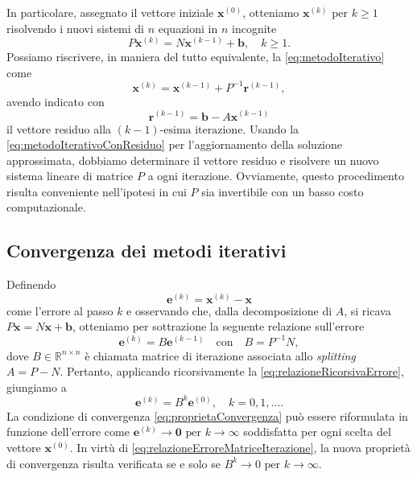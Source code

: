 In particolare, assegnato il vettore iniziale $\mathbf{x}^{(0)}$, otteniamo $\mathbf{x}^{(k)}$ per $k\ge1$ risolvendo i nuovi sistemi di $n$ equazioni in $n$
incognite
\begin{equation}
    \label{eq:metodoIterativo}
    P\mathbf{x}^{(k)}=N\mathbf{x}^{(k-1)} + \mathbf{b},\quad k\ge1.
\end{equation}
Possiamo riscrivere, in maniera del tutto equivalente, la \eqref{eq:metodoIterativo} come
\begin{equation}
    \label{eq:metodoIterativoConResiduo}
    \mathbf{x}^{(k)}=\mathbf{x}^{(k-1)} + P^{-1}\mathbf{r}^{(k-1)},
\end{equation}
avendo indicato con
\[
    \mathbf{r}^{(k-1)}=\mathbf{b}-A\mathbf{x}^{(k-1)}
\]
il vettore residuo alla $(k-1)\text{-esima iterazione}$.\newline
Usando la \eqref{eq:metodoIterativoConResiduo} per l'aggiornamento della soluzione approssimata, dobbiamo determinare il vettore residuo e risolvere un nuovo sistema lineare di
matrice $P$ a ogni iterazione. Ovviamente, questo procedimento risulta conveniente nell'ipotesi in cui $P$ sia invertibile con un basso costo computazionale.
\subsection{Convergenza dei metodi iterativi}
Definendo
\begin{equation}
    \label{eq:errorePassoK}
    \mathbf{e}^{(k)} = \mathbf{x}^{(k)}-\mathbf{x}
\end{equation}
come l'errore al passo $k$ e osservando che, dalla decomposizione di $A$, si ricava $P\mathbf{x}= N\mathbf{x}+\mathbf{b}$, otteniamo per sottrazione la seguente relazione sull'errore
\begin{equation}
    \label{eq:relazioneRicorsivaErrore}
    \mathbf{e}^{(k)} = B\mathbf{e}^{(k-1)} \quad \text{con} \quad B = P^{-1}N,
\end{equation}
dove $B\in\mathbb{R}^{n \times n}$ \`e chiamata matrice di iterazione associata allo \textit{splitting} $A = P - N$.
Pertanto, applicando ricorsivamente la \eqref{eq:relazioneRicorsivaErrore}, giungiamo a
\begin{equation}
    \label{eq:relazioneErroreMatriceIterazione}
    \mathbf{e}^{(k)}=B^{k}\mathbf{e}^{(0)},\quad k = 0,1, \dots.
\end{equation}
La condizione di convergenza \eqref{eq:proprietaConvergenza} pu\`o essere riformulata in funzione dell'errore come
$\mathbf{e}^{(k)} \rightarrow \mathbf{0} \text{ per } k\rightarrow{\infty}$ soddisfatta per ogni scelta del vettore $\mathbf{x}^{(0)}$.\newline
In virt\`u di \eqref{eq:relazioneErroreMatriceIterazione}, la nuova propriet\`a di convergenza risulta verificata se e solo se ${B}^{k} \rightarrow 0 \text{ per } k\rightarrow{\infty}$.

